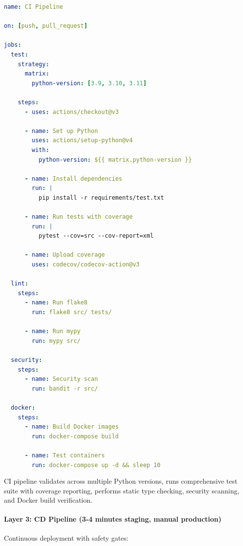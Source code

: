 \begin{lstlisting}[language=yaml, caption=.github/workflows/ci.yml]
name: CI Pipeline

on: [push, pull_request]

jobs:
  test:
    strategy:
      matrix:
        python-version: [3.9, 3.10, 3.11]
    
    steps:
      - uses: actions/checkout@v3
      
      - name: Set up Python
        uses: actions/setup-python@v4
        with:
          python-version: ${{ matrix.python-version }}
      
      - name: Install dependencies
        run: |
          pip install -r requirements/test.txt
      
      - name: Run tests with coverage
        run: |
          pytest --cov=src --cov-report=xml
      
      - name: Upload coverage
        uses: codecov/codecov-action@v3
  
  lint:
    steps:
      - name: Run flake8
        run: flake8 src/ tests/
      
      - name: Run mypy
        run: mypy src/
  
  security:
    steps:
      - name: Security scan
        run: bandit -r src/
  
  docker:
    steps:
      - name: Build Docker images
        run: docker-compose build
      
      - name: Test containers
        run: docker-compose up -d && sleep 10
\end{lstlisting}

CI pipeline validates across multiple Python versions, runs comprehensive test suite with coverage reporting, performs static type checking, security scanning, and Docker build verification.

\paragraph{Layer 3: CD Pipeline (3-4 minutes staging, manual production)}
Continuous deployment with safety gates:


